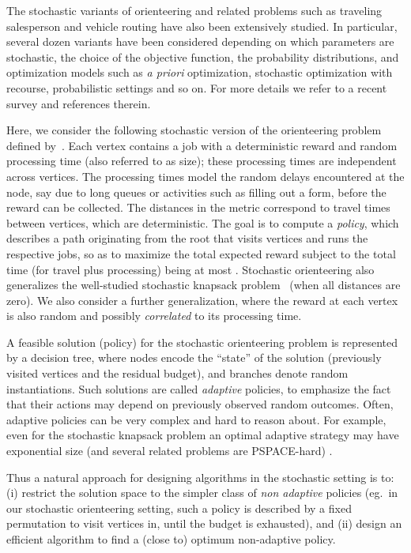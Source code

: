\documentclass[11pt,letterpaper]{article}
\numberwithin{algorithm}{section}
\begin{document}
The stochastic variants of orienteering and related problems such as traveling salesperson and vehicle routing have also been extensively studied. In particular, several dozen variants have been considered depending on which parameters are stochastic, the choice of the objective function, the probability distributions, and optimization models such as {\em a priori} optimization, stochastic optimization with recourse, probabilistic settings and so on.
For more details we refer to a recent survey \cite{Weyland} and references therein.

Here, we consider the following stochastic version of the orienteering problem defined by~\cite{GKNR12}. Each vertex contains a job with a deterministic reward and random processing time (also referred to as size); these processing times are independent across vertices. The processing times  model the random delays encountered at the node, say due to long queues or activities such as filling out a form, before the reward can be collected. The distances in the metric correspond to travel times between vertices, which are deterministic. The goal is to compute a {\em policy}, which describes a path originating from the root  that visits vertices and runs the respective jobs, so as to maximize the total expected reward subject to the total time (for travel plus processing) being at most .
Stochastic orienteering also generalizes the well-studied stochastic knapsack problem~\cite{DeanGV08,BGK11,Bhalgat11} (when all distances are zero).
We also consider a further generalization, where the reward at each vertex is also random and possibly {\em correlated} to its processing time. 



A feasible solution (policy) for the stochastic orienteering problem is represented by a decision tree, where nodes encode the ``state'' of the solution (previously visited vertices and the residual budget), and branches denote random instantiations. Such solutions are called {\em adaptive} policies, to emphasize the fact that their actions may depend on previously observed random outcomes.
Often, adaptive policies can be very complex and hard to reason about.
For example, even for the stochastic knapsack problem an optimal adaptive strategy may have exponential size (and
several related problems are PSPACE-hard) \cite{DeanGV08}.



Thus a natural approach for designing algorithms in the stochastic setting is to:
(i) restrict the solution space to the simpler class of {\em non adaptive} policies (eg.~in our stochastic orienteering setting, such a policy is described by a fixed permutation to visit vertices in, until the budget  is exhausted), and (ii) design an efficient algorithm to find a
(close to) optimum non-adaptive policy.
\end{document}
